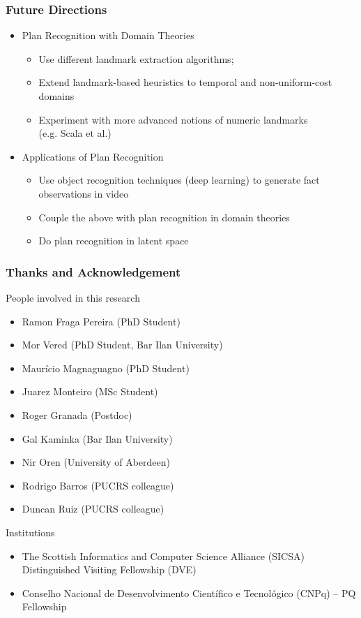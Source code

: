 \documentclass{beamer}
\begin{document}
\begin{frame}[c]\frametitle{Future Directions}
	\begin{itemize}
		\item Plan Recognition with Domain Theories
        \begin{itemize}
        	\item Use different landmark extraction algorithms;
			\item Extend landmark-based heuristics to temporal and non-uniform-cost domains
            \item Experiment with more advanced notions of numeric landmarks \\(e.g. Scala et al.)
        \end{itemize}
        \item Applications of Plan Recognition
        \begin{itemize}
        	\item Use object recognition techniques (deep learning) to generate fact observations in video
            \item Couple the above with plan recognition in domain theories
            \item Do plan recognition in latent space
        \end{itemize}
	\end{itemize}
\end{frame}

\begin{frame}[c]\frametitle{Thanks and Acknowledgement}
	People involved in this research
	\begin{itemize}
		\item Ramon Fraga Pereira (PhD Student)
		\item Mor Vered (PhD Student, Bar Ilan University)
		\item Maurício Magnaguagno (PhD Student)
		\item Juarez Monteiro (MSc Student)
		\item Roger Granada (Postdoc)
		\item Gal Kaminka (Bar Ilan University) 
		\item Nir Oren (University of Aberdeen)
		\item Rodrigo Barros (PUCRS colleague) 
		\item Duncan Ruiz (PUCRS colleague) 
	\end{itemize}
	Institutions
	\begin{itemize}
		\item The Scottish Informatics and Computer Science Alliance (SICSA) \\ Distinguished Visiting Fellowship (DVE)
		\item Conselho Nacional de Desenvolvimento Científico e Tecnológico (CNPq) -- PQ Fellowship
	\end{itemize}
\end{frame}
\end{document}
